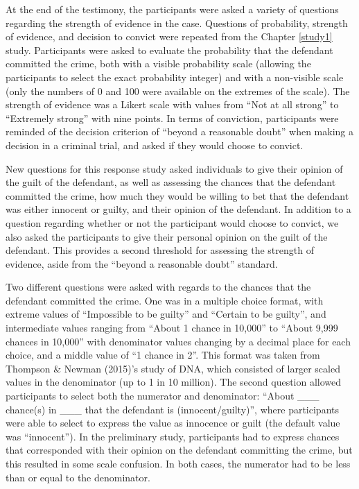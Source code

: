 \documentclass[print]{nuthesis}
\begin{document}
At the end of the testimony, the participants were asked a variety of questions regarding the strength of evidence in the case.
Questions of probability, strength of evidence, and decision to convict were repeated from the Chapter \ref{study1} study.
Participants were asked to evaluate the probability that the defendant committed the crime, both with a visible probability scale (allowing the participants to select the exact probability integer) and with a non-visible scale (only the numbers of 0 and 100 were available on the extremes of the scale).
The strength of evidence was a Likert scale with values from ``Not at all strong'' to ``Extremely strong'' with nine points.
In terms of conviction, participants were reminded of the decision criterion of ``beyond a reasonable doubt'' when making a decision in a criminal trial, and asked if they would choose to convict.

New questions for this response study asked individuals to give their opinion of the guilt of the defendant, as well as assessing the chances that the defendant committed the crime, how much they would be willing to bet that the defendant was either innocent or guilty, and their opinion of the defendant.
In addition to a question regarding whether or not the participant would choose to convict, we also asked the participants to give their personal opinion on the guilt of the defendant.
This provides a second threshold for assessing the strength of evidence, aside from the ``beyond a reasonable doubt'' standard.

Two different questions were asked with regards to the chances that the defendant committed the crime.
One was in a multiple choice format, with extreme values of ``Impossible to be guilty'' and ``Certain to be guilty'', and intermediate values ranging from ``About 1 chance in 10,000'' to ``About 9,999 chances in 10,000'' with denominator values changing by a decimal place for each choice, and a middle value of ``1 chance in 2''.
This format was taken from Thompson \& Newman (2015)'s study of DNA, which consisted of larger scaled values in the denominator (up to 1 in 10 million).
The second question allowed participants to select both the numerator and denominator: ``About \_\_\_ chance(s) in \_\_\_ that the defendant is (innocent/guilty)'', where participants were able to select to express the value as innocence or guilt (the default value was ``innocent'').
In the preliminary study, participants had to express chances that corresponded with their opinion on the defendant committing the crime, but this resulted in some scale confusion.
In both cases, the numerator had to be less than or equal to the denominator.
\end{document}
